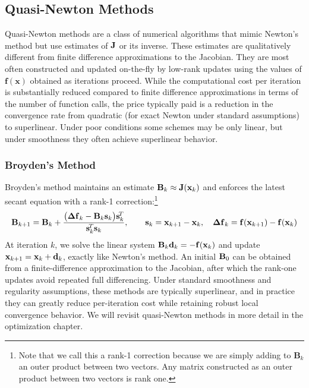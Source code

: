 \subsection{Quasi-Newton Methods}
\label{sec:quasi-newton_methods}

Quasi-Newton methods are a class of numerical algorithms that mimic Newton's method but use estimates of \(\mathbf{J}\) or its inverse. These estimates are qualitatively different from finite difference approximations to the Jacobian. They are most often constructed and updated on-the-fly by low-rank updates using the values of $\mathbf f(\mathbf x)$ obtained as iterations proceed. While the computational cost per iteration is substantially reduced compared to finite difference approximations in terms of the number of function calls, the price typically paid is a reduction in the convergence rate from quadratic (for exact Newton under standard assumptions) to superlinear. Under poor conditions some schemes may be only linear, but under smoothness they often achieve superlinear behavior.



\subsubsection{Broyden's Method}
Broyden's method maintains an estimate $\mathbf{B}_k \approx \mathbf{J}(\mathbf{x}_k)$ and enforces the latest secant equation with a rank-1 correction:\footnote{Note that we call this a rank-1 correction because we are simply adding to $\mathbf B_k$ an outer product between two vectors. Any matrix constructed as an outer product between two vectors is rank one. }
\begin{equation}
  \mathbf{B}_{k+1}
  =
  \mathbf{B}_k
  +
  \frac{\bigl(\mathbf{\Delta f}_k - \mathbf{B}_k \mathbf{s}_k\bigr)\mathbf{s}_k^{\!T}}
       {\mathbf{s}_k^{\!T}\mathbf{s}_k},
  \qquad
  \mathbf{s}_k = \mathbf{x}_{k+1}-\mathbf{x}_k,
  \quad
  \mathbf{\Delta f}_k = \mathbf{f}(\mathbf{x}_{k+1})-\mathbf{f}(\mathbf{x}_k)
\end{equation}
At iteration $k$, we solve the linear system $\mathbf{B}_k \mathbf{d}_k = -\mathbf{f}(\mathbf{x}_k)$ and update $\mathbf{x}_{k+1}=\mathbf{x}_k+\mathbf{d}_k$, exactly like Newton's method. An initial $\mathbf{B}_0$ can be obtained from a finite-difference approximation to the Jacobian, after which the rank-one updates avoid repeated full differencing. Under standard smoothness and regularity assumptions, these methods are typically superlinear, and in practice they can greatly reduce per-iteration cost while retaining robust local convergence behavior. We will revisit quasi-Newton methods in more detail in the optimization chapter.



